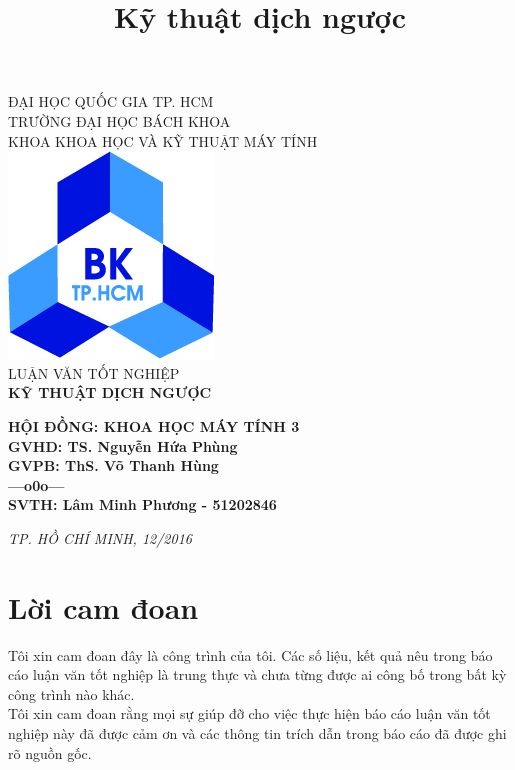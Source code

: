\documentclass[12pt]{report}
\title{Kỹ thuật dịch ngược}
\begin{document}
	\begin{changemargin}{-1cm}{0cm}
	\begin{center}
		\large{
		ĐẠI HỌC QUỐC GIA TP. HCM\\
		TRƯỜNG ĐẠI HỌC BÁCH KHOA\\
		KHOA KHOA HỌC VÀ KỸ THUẬT MÁY TÍNH\\[10ex]}
		\includegraphics[scale=0.5]{logoBK_jpg.jpg}\\[10ex]
		\large{LUẬN VĂN TỐT NGHIỆP\\[10ex]}
		\LARGE{\textbf{KỸ THUẬT DỊCH NGƯỢC}\\[10ex]}
	\end{center}
	
	\large{
		\textbf{
	\hspace*{4.95cm}HỘI ĐỒNG: KHOA HỌC MÁY TÍNH 3\\
	\hspace*{7cm}GVHD: TS. Nguyễn Hứa Phùng\\
	\hspace*{7.05cm}GVPB: ThS. Võ Thanh Hùng\\
	\hspace*{10cm}---o0o---\\
	\hspace*{7.05cm}SVTH: Lâm Minh Phương - 51202846\\[5ex]
	}
	\begin{center}
		\textit{TP. HỒ CHÍ MINH, 12/2016}
	\end{center}
	
	}
	\end{changemargin}
	\chapter*{Lời cam đoan}
	
	Tôi xin cam đoan đây là công trình của tôi. Các số liệu, kết quả nêu trong báo cáo luận văn tốt nghiệp là trung thực và chưa từng được ai công bố trong bất kỳ công trình
	nào khác.\\
	Tôi xin cam đoan rằng mọi sự giúp đỡ cho việc thực hiện báo cáo luận văn tốt nghiệp này đã được cảm ơn và các thông tin trích dẫn trong báo cáo đã được ghi rõ nguồn gốc.
	
\end{document}
